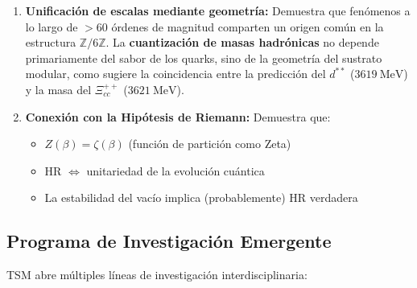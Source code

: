 \documentclass[11pt, a4paper]{article}
\theoremstyle{plain}
\theoremstyle{definition}
\begin{document}
\begin{enumerate}
    \item \textbf{Unificación de escalas mediante geometría:} Demuestra que fenómenos a lo largo de $>60$ órdenes de magnitud comparten un origen común en la estructura $\mathbb{Z}/6\mathbb{Z}$. La \textbf{cuantización de masas hadrónicas} no depende primariamente del sabor de los quarks, sino de la geometría del sustrato modular, como sugiere la coincidencia entre la predicción del $d^{**}$ ($3619\ \si{\mega\electronvolt}$) y la masa del $\Xi_{cc}^{++}$ ($3621\ \si{\mega\electronvolt}$).
    
    \item \textbf{Conexión con la Hipótesis de Riemann:} Demuestra que:
    \begin{itemize}
        \item $Z(\beta) = \zeta(\beta)$ (función de partición como Zeta)
        \item HR $\Leftrightarrow$ unitariedad de la evolución cuántica
        \item La estabilidad del vacío implica (probablemente) HR verdadera
    \end{itemize}
\end{enumerate}

\subsection{Programa de Investigación Emergente}

TSM abre múltiples líneas de investigación interdisciplinaria:
\end{document}
